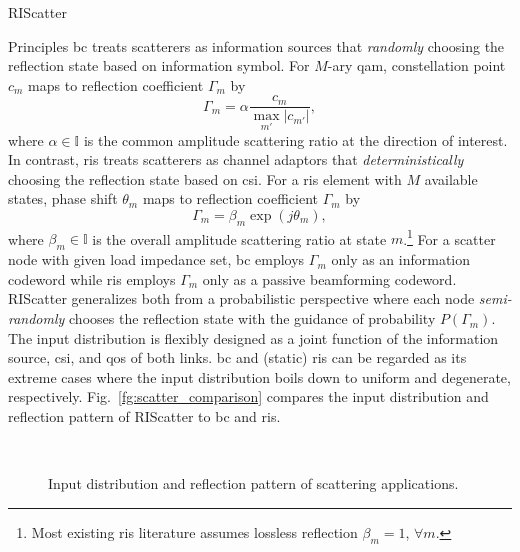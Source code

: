 \documentclass[journal]{IEEEtran}
\begin{document}
\begin{section}{RIScatter}
\begin{subsection}{Principles}
		\gls{bc} treats scatterers as information sources that \emph{randomly} choosing the reflection state based on information symbol.
		For $M$-ary \gls{qam}, constellation point $c_m$ maps to reflection coefficient $\Gamma_m$ by \cite{Thomas2012a}
		\begin{equation}
			\Gamma_m = \alpha \frac{c_m}{\max_{m'} \lvert c_{m'} \rvert},
			\label{eq:backscatter_modulation}
		\end{equation}
		where $\alpha \in \mathbb{I}$ is the common amplitude scattering ratio at the direction of interest.
		In contrast, \gls{ris} treats scatterers as channel adaptors that \emph{deterministically} choosing the reflection state based on \gls{csi}.
		For a \gls{ris} element with $M$ available states, phase shift $\theta_m$ maps to reflection coefficient $\Gamma_m$ by \cite{Wu2018}
		\begin{equation}
			\Gamma_m = \beta_m \exp(j \theta_m),
			\label{eq:passive_beamforming}
		\end{equation}
		where $\beta_m \in \mathbb{I}$ is the overall amplitude scattering ratio at state $m$.\footnote{Most existing \gls{ris} literature assumes lossless reflection $\beta_m=1$, $\forall m$.}
		For a scatter node with given load impedance set, \gls{bc} employs $\Gamma_m$ only as an information codeword while \gls{ris} employs $\Gamma_m$ only as a passive beamforming codeword.
		RIScatter generalizes both from a probabilistic perspective where each node \emph{semi-randomly} chooses the reflection state with the guidance of probability $P(\Gamma_m)$.
		The input distribution is flexibly designed as a joint function of the information source, \gls{csi}, and \gls{qos} of both links.
		\gls{bc} and (static) \gls{ris} can be regarded as its extreme cases where the input distribution boils down to uniform and degenerate, respectively.
		Fig.~\ref{fg:scatter_comparison} compares the input distribution and reflection pattern of RIScatter to \gls{bc} and \gls{ris}.
		\begin{figure}[!t]
			\centering
			\\
			\caption{
				Input distribution and reflection pattern of scattering applications.
}
\end{figure}
\end{subsection}
\end{section}
\end{document}
